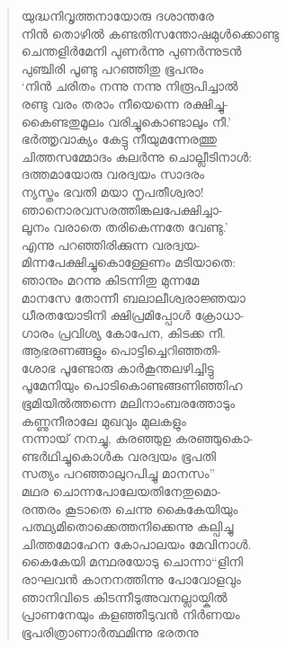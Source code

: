 \begin{verse}
യുദ്ധനിവൃത്തനായോരു ദശാന്തരേ\\
നിന്‍ തൊഴില്‍ കണ്ടതിസന്തോഷമുള്‍ക്കൊണ്ടു\\
ചെന്തളിര്‍മേനി പുണര്‍ന്നു പുണര്‍ന്നുടന്‍\\
പുഞ്ചിരി പൂണ്ടു പറഞ്ഞിതു ഭൂപനും\\
‘നിന്‍ ചരിതം നന്നു നന്നു നിരൂപിച്ചാല്‍\\
രണ്ടു വരം തരാം നീയെന്നെ രക്ഷിച്ചു-\\
കൈണ്ടതുമൂലം വരിച്ചുകൊണ്ടാലും നീ.’\\
ഭര്‍ത്തൃവാക്യം കേട്ടു നീയുമന്നേരത്തു\\
ചിത്തസമ്മോദം കല‍ര്‍ന്നു ചൊല്ലീടിനാള്‍:\\
ദത്തമായോരു വരദ്വയം സാദരം\\
ന്യസ്തം ഭവതി മയാ നൃപതീശ്വരാ!\\
ഞാനൊരവസരത്തിങ്കലപേക്ഷിച്ചാ-\\
ലൂനം വരാതെ തരികെന്നതേ വേണ്ടു.’\\
എന്നു പറഞ്ഞിരിക്കുന്ന വരദ്വയ-\\
മിന്നപേക്ഷിച്ചുകൊള്ളേണം മടിയാതെ:\\
ഞാനും മറന്നു കിടന്നിതു മുന്നമേ\\
മാനസേ തോന്നീ ബലാലീശ്വരാജ്ഞയാ\\
ധീരതയോടിനി ക്ഷിപ്രമിപ്പോള്‍ ക്രോധാ-\\
ഗാരം പ്രവിശ്യ കോപേന, കിടക്ക നീ.\\
ആഭരണങ്ങളും പൊട്ടിച്ചെറിഞ്ഞതി-\\
ശോഭ പൂണ്ടോരു കാര്‍കൂന്തലഴിച്ചിട്ടു\\
പൂമേനിയും പൊടികൊണ്ടങ്ങണിഞ്ഞിഹ\\
ഭൂമിയില്‍ത്തന്നെ മലിനാംബരത്തോടും\\
കണ്ണുനീരാലേ മുഖവും മുലകളും\\
നന്നായ് നനച്ചു, കരഞ്ഞുഉ കരഞ്ഞുകൊ-\\
ണ്ടര്‍ഥിച്ചുകൊള്‍ക വരദ്വയം ഭൂപതി\\
സത്യം പറഞ്ഞാലുറപിച്ചു മാനസം”\\
മഥര ചൊന്നപോലേയതിനേതുമൊ-\\
രന്തരം കൂടാതെ ചെന്നു കൈകേയിയും\\
പത്ഥ്യമിതൊക്കെത്തനിക്കെന്നു കല്പിച്ചു\\
ചിത്തമോഹേന കോപാലയം മേവിനാള്‍.\\
കൈകേയി മന്ഥരയോടു ചൊന്നാ“ളിനി\\
രാഘവന്‍ കാനനത്തിന്നു പോവോളവും\\
ഞാനിവിടെ കിടന്നീടുഅവനല്ലായ്കില്‍\\
പ്രാണനേയും കളഞ്ഞീടുവന്‍ നിര്‍ണയം\\
ഭൂപരിത്രാണാര്‍ത്ഥമിന്നു ഭരതനു\\

\end{verse}
